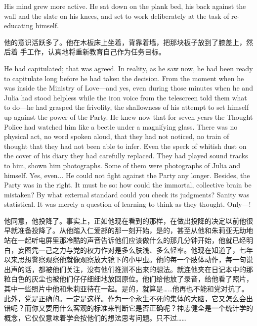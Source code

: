 \begin{paracol}{2}
His mind grew more active. He sat down on the plank bed, his back
against the wall and the slate on his knees, and set to work
deliberately at the task of re-educating himself.

\switchcolumn

他的意识活跃多了。他在木板床上坐着，背靠着墙，把那块板子放到了膝盖上，然后着
手工作，认真地将重新教育自己作为任务目标。

\switchcolumn*

He had capitulated; that was agreed. In reality, as he saw now, he had
been ready to capitulate long before he had taken the decision. From the
moment when he was inside the Ministry of Love---and yes, even during
those minutes when he and Julia had stood helpless while the iron voice
from the telescreen told them what to do---he had grasped the frivolity,
the shallowness of his attempt to set himself up against the power of
the Party. He knew now that for seven years the Thought Police had
watched him like a beetle under a magnifying glass. There was no
physical act, no word spoken aloud, that they had not noticed, no train
of thought that they had not been able to infer. Even the speck of
whitish dust on the cover of his diary they had carefully replaced. They
had played sound tracks to him, shown him photographs. Some of them were
photographs of Julia and himself. Yes, even... He could not fight
against the Party any longer. Besides, the Party was in the right. It
must be so: how could the immortal, collective brain be mistaken? By
what external standard could you check its judgments? Sanity was
statistical. It was merely a question of learning to think as they
thought. Only---!

\switchcolumn

他同意，他投降了。事实上，正如他现在看到的那样，在做出投降的决定以前他很早就准备投降了。从他踏入仁爱部的那一刻开始，是的，甚至从他和朱莉亚无助地站在一起听电屏里那冷酷的声音告诉他们应该做什么的那几分钟开始，他就已经明白，妄图凭一己之力与党的权力作对是多么肤浅、多么轻率。他现在知道了，七年以来思想警察观察他就像观察放大镜下的小甲虫。他的每一个肢体动作，每一句说出声的话，都被他们关注，没有他们推测不出来的想法。就连他夹在日记本中的那粒白色的灰尘也被他们仔仔细细地放回原位。他们给他放了录音，给他看了照片，其中一些照片中他和朱莉亚待在一起。是的，就算是\ldots\ldots 他再也不能和党对抗了。此外，党是正确的。一定是这样。作为一个永生不死的集体的大脑，它又怎么会出错呢？而你又要用什么客观的标准来判断它是否正确呢？神志健全是一个统计学的概念，它仅仅意味着学会按他们的想法思考问题。只不过\ldots\ldots{}


\end{paracol}

